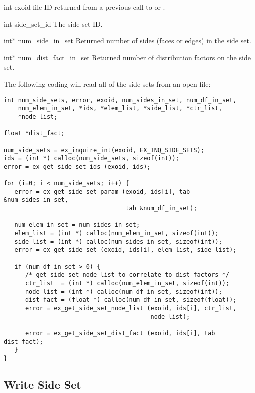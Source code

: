 \begin{parameters}
\item[{int exoid} {\R{}}]
\exo{} file ID returned from a previous call to  
or .

\item[{int side_set_id \R{}}]
The side set ID.

\item[{int* num_side_in_set \W{}}]
Returned number of sides (faces or edges) in the side set.

\item[{int* num_dist_fact_in_set \W{}}]
Returned number of distribution factors on the side set.
\end{parameters}

The following coding will read all of the side sets from 
an open \exo{} file:

\begin{lstlisting}
int num_side_sets, error, exoid, num_sides_in_set, num_df_in_set, 
    num_elem_in_set, *ids, *elem_list, *side_list, *ctr_list, 
    *node_list;

float *dist_fact;

num_side_sets = ex_inquire_int(exoid, EX_INQ_SIDE_SETS);
ids = (int *) calloc(num_side_sets, sizeof(int));
error = ex_get_side_set_ids (exoid, ids);

for (i=0; i < num_side_sets; i++) {
   error = ex_get_side_set_param (exoid, ids[i], tab &num_sides_in_set, 
                                  tab &num_df_in_set);

   num_elem_in_set = num_sides_in_set;
   elem_list = (int *) calloc(num_elem_in_set, sizeof(int));
   side_list = (int *) calloc(num_sides_in_set, sizeof(int));
   error = ex_get_side_set (exoid, ids[i], elem_list, side_list);

   if (num_df_in_set > 0) {
      /* get side set node list to correlate to dist factors */
      ctr_list  = (int *) calloc(num_elem_in_set, sizeof(int));
      node_list = (int *) calloc(num_df_in_set, sizeof(int));
      dist_fact = (float *) calloc(num_df_in_set, sizeof(float));
      error = ex_get_side_set_node_list (exoid, ids[i], ctr_list, 
                                         node_list);

      error = ex_get_side_set_dist_fact (exoid, ids[i], tab dist_fact);
   }
}
\end{lstlisting}


\subsection{Write Side Set}

